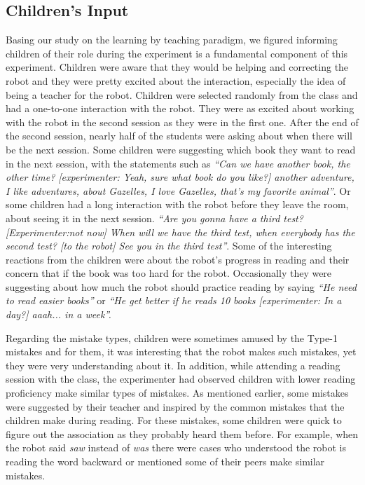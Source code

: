 \documentclass{sigchi}
\begin{document}
\subsection{Children's Input}
Basing our study on the learning by teaching paradigm, we figured informing children of their role during the experiment is a fundamental component of this experiment. 
Children were aware that they would be helping and correcting the robot and they were pretty excited about the interaction, especially the idea of being a teacher for the robot.
Children were selected randomly from the class and had a one-to-one interaction with the robot. 
They were as excited about working with the robot in the second session as they were in the first one. 
After the end of the second session, nearly half of the students were asking about when there will be the next session. 
Some children were suggesting which book they want to read in the next session, with the statements such as
\textit{``Can we have another book, the other time? [experimenter: Yeah, sure what book do you like?] another adventure, I like adventures, about Gazelles, I love Gazelles, that's my favorite animal''}.
Or some children had a long interaction with the robot before they leave the room, about seeing it in the next session.
\textit{``Are you gonna have a third test? [Experimenter:not now] When will we have the third test, when everybody has the second test? [to the robot] See you in the third test''}.
Some of the interesting reactions from the children were about the robot's progress in reading and their concern that if the book was too hard for the robot.
Occasionally they were suggesting about how much the robot should practice reading by saying \textit{``He need to read easier books''} or \textit{``He get better if he reads 10 books [experimenter: In a day?] aaah... in a week''.}

Regarding the mistake types, children were sometimes amused by the Type-1 mistakes and for them, it was interesting that the robot makes such mistakes, yet they were very understanding about it.
In addition, while attending a reading session with the class, the experimenter had observed children with lower reading proficiency make similar types of mistakes.
As mentioned earlier, some mistakes were suggested by their teacher and inspired by the common mistakes that the children make during reading.
For these mistakes, some children were quick to figure out the association as they probably heard them before. 
For example, when the robot said \textit{saw} instead of \textit{was} there were cases who understood the robot is reading the word backward or mentioned some of their peers make similar mistakes.
\end{document}
